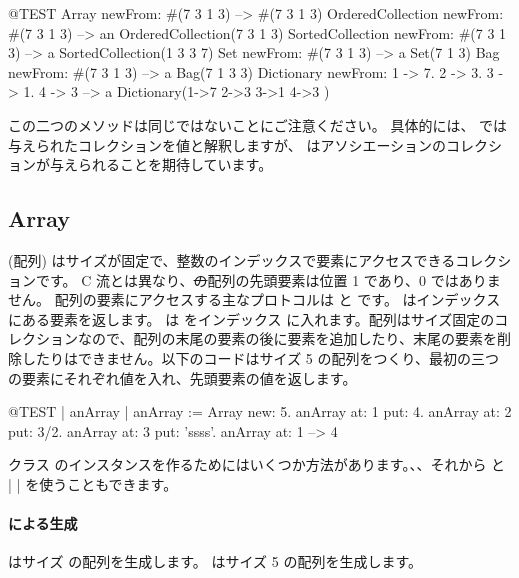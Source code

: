 \documentclass[a4paper,10pt,twoside]{book}
\begin{document}
\begin{code}{@TEST}
Array newFrom: #(7 3 1 3)                                          --> #(7 3 1 3)
OrderedCollection newFrom: #(7 3 1 3)                     --> an OrderedCollection(7 3 1 3)
SortedCollection newFrom: #(7 3 1 3)                       --> a SortedCollection(1 3 3 7)
Set newFrom: #(7 3 1 3)                                            --> a Set(7 1 3)
Bag newFrom: #(7 3 1 3)                                           --> a Bag(7 1 3 3)
Dictionary newFrom: {1 -> 7. 2 -> 3. 3 -> 1. 4 -> 3} --> a Dictionary(1->7 2->3 3->1 4->3 )
\end{code}
\noindent
この二つのメソッドは同じではないことにご注意ください。
具体的には、 では与えられたコレクションを値と解釈しますが、 はアソシエーションのコレクションが与えられることを期待しています。

\subsection{Array}
 (配列) はサイズが固定で、整数のインデックスで要素にアクセスできるコレクションです。
C 流とは異なり、\st の配列の先頭要素は位置 1 であり、0 ではありません。
配列の要素にアクセスする主なプロトコルは  と  です。 はインデックス  にある要素を返します。 は  をインデックス  に入れます。配列はサイズ固定のコレクションなので、配列の末尾の要素の後に要素を追加したり、末尾の要素を削除したりはできません。以下のコードはサイズ 5 の配列をつくり、最初の三つの要素にそれぞれ値を入れ、先頭要素の値を返します。

\begin{code}{@TEST | anArray | }
anArray := Array new: 5.
anArray at: 1 put: 4.
anArray at: 2 put: 3/2.
anArray at: 3 put: 'ssss'.
anArray at: 1 --> 4
\end{code}

クラス  のインスタンスを作るためにはいくつか方法があります。、、それから \ct{#( )} と \ct|{ }| を使うこともできます。

\paragraph{ による生成}  はサイズ  の配列を生成します。
 はサイズ 5 の配列を生成します。
\end{document}
